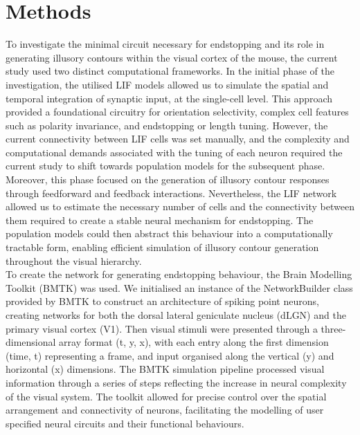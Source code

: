 \documentclass[12pt]{article}
\begin{document}
\section*{Methods}
To investigate the minimal circuit necessary for endstopping and its role in generating illusory contours within the visual cortex of the mouse, the current study used two distinct computational frameworks. In the initial phase of the investigation, the utilised LIF models allowed us to simulate the spatial and temporal integration of synaptic input, at the single-cell level. This approach provided a foundational circuitry for orientation selectivity, complex cell features such as polarity invariance, and endstopping or length tuning. However, the current connectivity between LIF cells was set manually, and the complexity and computational demands associated with the tuning of each neuron required the current study to shift towards population models for the subsequent phase. Moreover, this phase focused on the generation of illusory contour responses through feedforward and feedback interactions. Nevertheless, the LIF network allowed us to estimate the necessary number of cells and the connectivity between them required to create a stable neural mechanism for endstopping. The population models could then abstract this behaviour into a computationally tractable form, enabling efficient simulation of illusory contour generation throughout the visual hierarchy. 
\\
To create the network for generating endstopping behaviour, the Brain Modelling Toolkit (BMTK) was used. We initialised an instance of the NetworkBuilder class provided by BMTK to construct an architecture of spiking point neurons, creating networks for both the dorsal lateral geniculate nucleus (dLGN) and the primary visual cortex (V1). Then visual stimuli were presented through a three-dimensional array format (t, y, x), with each entry along the first dimension (time, t) representing a frame, and input organised along the vertical (y) and horizontal (x) dimensions. The BMTK simulation pipeline processed visual information through a series of steps reflecting the increase in neural complexity of the visual system. The toolkit allowed for precise control over the spatial arrangement and connectivity of neurons, facilitating the modelling of user specified neural circuits and their functional behaviours. \\
\end{document}

